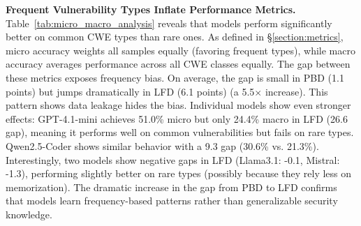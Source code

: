 \documentclass[lettersize,journal]{IEEEtran}
\begin{document}
\textbf{Frequent Vulnerability Types Inflate Performance Metrics.} Table~\ref{tab:micro_macro_analysis} reveals that models perform significantly better on common \gls{CWE} types than rare ones. As defined in \S\ref{section:metrics}, micro accuracy weights all samples equally (favoring frequent types), while macro accuracy averages performance across all \gls{CWE} classes equally. The gap between these metrics exposes frequency bias. On average, the gap is small in PBD (1.1 points) but jumps dramatically in LFD (6.1 points) (a 5.5$\times$ increase). This pattern shows data leakage hides the bias. Individual models show even stronger effects: GPT-4.1-mini achieves 51.0\% micro but only 24.4\% macro in LFD (26.6 gap), meaning it performs well on common vulnerabilities but fails on rare types. Qwen2.5-Coder shows similar behavior with a 9.3 gap (30.6\% vs. 21.3\%). Interestingly, two models show negative gaps in LFD (Llama3.1: -0.1, Mistral: -1.3), performing slightly better on rare types (possibly because they rely less on memorization). The dramatic increase in the gap from PBD to LFD confirms that models learn frequency-based patterns rather than generalizable security knowledge.
\begin{table}[!t]
\centering
\caption{Micro/Macro accuracy analysis revealing model performance disparities across \gls{CWE} types.}
\label{tab:micro_macro_analysis}
\small
\renewcommand{\arraystretch}{1.1}
\setlength{\tabcolsep}{2pt}
\end{table}
\end{document}
